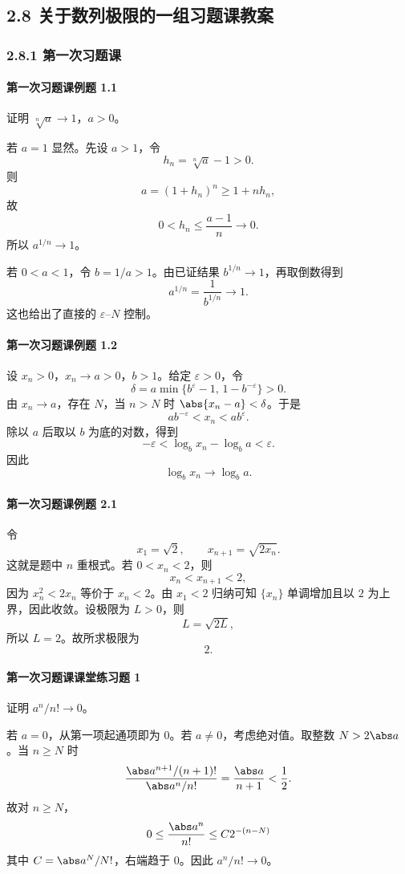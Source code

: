 \subsection*{2.8 关于数列极限的一组习题课教案}

\subsubsection*{2.8.1 第一次习题课}

\paragraph{第一次习题课例题 1.1}
\begin{xsolution}
证明 $\sqrt[n]a\to1$，$a>0$。

若 $a=1$ 显然。先设 $a>1$，令
\[
  h_n=\sqrt[n]a-1>0.
\]
则
\[
  a=(1+h_n)^n\ge1+nh_n,
\]
故
\[
  0<h_n\le\frac{a-1}{n}\to0.
\]
所以 $a^{1/n}\to1$。

若 $0<a<1$，令 $b=1/a>1$。由已证结果 $b^{1/n}\to1$，再取倒数得到
\[
  a^{1/n}=\frac1{b^{1/n}}\to1.
\]
这也给出了直接的 $\varepsilon$--$N$ 控制。
\end{xsolution}

\paragraph{第一次习题课例题 1.2}
\begin{xsolution}
设 $x_n>0$，$x_n\to a>0$，$b>1$。给定 $\varepsilon>0$，令
\[
  \delta=a\min\{b^\varepsilon-1,\,1-b^{-\varepsilon}\}>0.
\]
由 $x_n\to a$，存在 $N$，当 $n>N$ 时 $\abs{x_n-a}<\delta$。于是
\[
  ab^{-\varepsilon}<x_n<ab^\varepsilon.
\]
除以 $a$ 后取以 $b$ 为底的对数，得到
\[
  -\varepsilon<\log_bx_n-\log_ba<\varepsilon.
\]
因此
\[
  \boxed{\log_bx_n\to\log_ba}.
\]
\end{xsolution}

\paragraph{第一次习题课例题 2.1}
\begin{xsolution}
令
\[
  x_1=\sqrt2,
  \qquad
  x_{n+1}=\sqrt{2x_n}.
\]
这就是题中 $n$ 重根式。若 $0<x_n<2$，则
\[
  x_n<x_{n+1}<2,
\]
因为 $x_n^2<2x_n$ 等价于 $x_n<2$。由 $x_1<2$ 归纳可知 $\{x_n\}$ 单调增加且以 $2$ 为上界，因此收敛。设极限为 $L>0$，则
\[
  L=\sqrt{2L},
\]
所以 $L=2$。故所求极限为
\[
  \boxed{2}.
\]
\end{xsolution}

\paragraph{第一次习题课课堂练习题 1}
\begin{xsolution}
证明 $a^n/n!\to0$。

若 $a=0$，从第一项起通项即为 $0$。若 $a\ne0$，考虑绝对值。取整数 $N>2\abs a$。当 $n\ge N$ 时
\[
  \frac{\abs a^{n+1}/(n+1)!}{\abs a^n/n!}
  =\frac{\abs a}{n+1}<\frac12.
\]
故对 $n\ge N$，
\[
  0\le\frac{\abs a^n}{n!}
  \le C2^{-(n-N)}
\]
其中 $C=\abs a^N/N!$，右端趋于 $0$。因此 $a^n/n!\to0$。
\end{xsolution}

